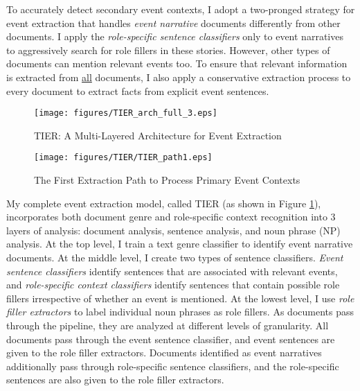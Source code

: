 To accurately detect secondary event contexts, 
I adopt a two-pronged strategy for event extraction that
handles {\it event narrative} documents differently from other
documents. 
I apply the {\it role-specific sentence classifiers} only to event
narratives to aggressively search for
role fillers in these stories. 
However, other types of documents can mention relevant events too.
To ensure that relevant
information is extracted from \underline{all} documents, I also 
apply a conservative extraction process to every document to extract
facts from explicit event sentences. 
\begin{figure}[h]
 \centering
 \texttt{[image: figures/TIER\_arch\_full\_3.eps]}
 \caption{TIER: A Multi-Layered Architecture for Event Extraction}
\label{TIER_flow_chart_chap3}
\end{figure} 

\begin{figure}[h]
 \centering
 \texttt{[image: figures/TIER/TIER\_path1.eps]}
 \caption{The First Extraction Path to Process Primary Event Contexts}
\label{TIER_path_1}
\end{figure} 

My complete
event extraction model, called TIER 
(as shown in Figure \ref{TIER_flow_chart_chap3}), 
incorporates both document genre
and role-specific context recognition into 3 layers of analysis:
document analysis, sentence analysis, and noun phrase (NP) analysis.
At the top level, I train a text genre classifier to identify event
narrative documents. At the middle level, I create two types of
sentence classifiers.  {\it Event sentence classifiers} identify
sentences that are associated with relevant events, and {\it
  role-specific context classifiers} identify sentences that contain
possible role fillers irrespective of whether an event is
mentioned. At the lowest level, I use {\it role filler extractors} to
label individual noun phrases as role fillers.  As documents pass
through the pipeline, they are analyzed at different levels of
granularity.
All documents pass through the event sentence classifier, and event
sentences are given to the role filler extractors.  
Documents identified as event narratives additionally pass through 
role-specific sentence classifiers, and the role-specific sentences are
also given to the role filler extractors. 



